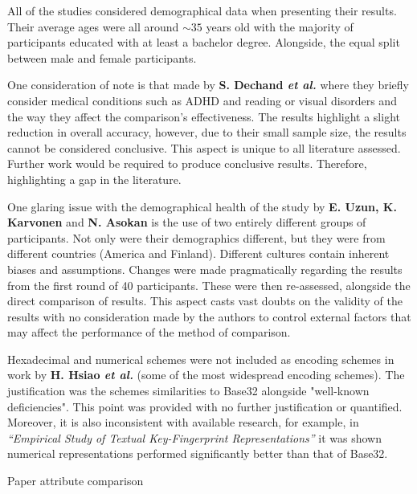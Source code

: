 All of the studies considered demographical data when presenting their results. Their average ages were all around $\sim35$ years old with the majority of participants educated with at least a bachelor degree. Alongside, the equal split between male and female participants.

One consideration of note is that made by \textbf{S. Dechand \textit{et al.}}\cite{dechand2016empirical} where they briefly consider medical conditions such as ADHD and reading or visual disorders and the way they affect the comparison's effectiveness. The results highlight a slight reduction in overall accuracy, however, due to their small sample size, the results cannot be considered conclusive. This aspect is unique to all literature assessed. Further work would be required to produce conclusive results. Therefore, highlighting a gap in the literature.

One glaring issue with the demographical health of the study by \textbf{E. Uzun, K. Karvonen} and \textbf{N. Asokan}\cite{uzun2007usability} is the use of two entirely different groups of participants. Not only were their demographics different, but they were from different countries (America and Finland). Different cultures contain inherent biases and assumptions. Changes were made pragmatically regarding the results from the first round of 40 participants. These were then re-assessed, alongside the direct comparison of results. This aspect casts vast doubts on the validity of the results with no consideration made by the authors to control external factors that may affect the performance of the method of comparison.

Hexadecimal and numerical schemes were not included as encoding schemes in work by \textbf{H. Hsiao \textit{et al.}}\cite{hsiao2009study} (some of the most widespread encoding schemes). The justification was the schemes similarities to Base32  alongside "well-known deficiencies". This point was provided with no further justification or quantified. Moreover, it is also inconsistent with available research, for example, in \textit{``Empirical Study of Textual Key-Fingerprint Representations''}\cite{dechand2016empirical} it was shown numerical representations performed significantly better than that of Base32.

\begin{table}[h!]
    \makebox[\textwidth][c]{
        
    }%
    \caption{Paper attribute comparison}
    \label{tab:attacker}
\end{table}

